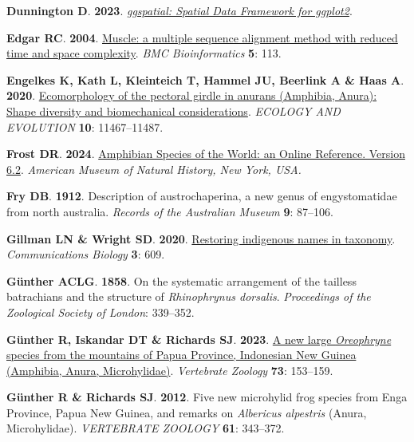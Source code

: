 \documentclass[
  letterpaper,
  DIV=11,
  numbers=noendperiod]{scrartcl}
\newlength{\cslhangindent}
\newenvironment{CSLReferences}[2] %
 {\begin{list}{}{%
  \setlength{\itemindent}{0pt}
  \setlength{\leftmargin}{0pt}
  \setlength{\parsep}{0pt}
  \ifodd #1
   \setlength{\leftmargin}{\cslhangindent}
   \setlength{\itemindent}{-1\cslhangindent}
  \fi
  \setlength{\itemsep}{#2\baselineskip}}}
 {\end{list}}
\begin{document}
\begin{CSLReferences}{0}{1}
\textbf{\textbf{Dunnington D}}. \textbf{2023}.
\emph{\href{https://CRAN.R-project.org/package=ggspatial}{{ggspatial:
Spatial Data Framework for ggplot2}}}.

\textbf{\textbf{Edgar RC}}. \textbf{2004}.
\href{https://doi.org/10.1186/1471-2105-5-113}{{Muscle: a multiple
sequence alignment method with reduced time and space complexity}}.
\emph{BMC Bioinformatics} \textbf{5}: 113.

\textbf{\textbf{Engelkes K}, \textbf{Kath L}, \textbf{Kleinteich T},
\textbf{Hammel JU}, \textbf{Beerlink A} \& \textbf{Haas A}}.
\textbf{2020}. \href{https://doi.org/10.1002/ece3.6784}{{Ecomorphology
of the pectoral girdle in anurans (Amphibia, Anura): Shape diversity and
biomechanical considerations}}. \emph{ECOLOGY AND EVOLUTION}
\textbf{10}: 11467--11487.

\textbf{\textbf{Frost DR}}. \textbf{2024}.
\href{https://doi.org/doi.org/10.5531/db.vz.0001}{{Amphibian Species of
the World: an Online Reference. Version 6.2}}. \emph{American Museum of
Natural History, New York, USA.}

\textbf{\textbf{Fry DB}}. \textbf{1912}. Description of austrochaperina,
a new genus of engystomatidae from north australia. \emph{Records of the
Australian Museum} \textbf{9}: 87--106.

\textbf{\textbf{Gillman LN} \& \textbf{Wright SD}}. \textbf{2020}.
\href{https://doi.org/10.1038/s42003-020-01344-y}{{Restoring indigenous
names in taxonomy}}. \emph{Communications Biology} \textbf{3}: 609.

\textbf{\textbf{Günther ACLG}}. \textbf{1858}. {On the systematic
arrangement of the tailless batrachians and the structure of
\emph{Rhinophrynus dorsalis}}. \emph{Proceedings of the Zoological
Society of London}: 339--352.

\textbf{\textbf{Günther R}, \textbf{Iskandar DT} \& \textbf{Richards
SJ}}. \textbf{2023}. \href{https://doi.org/10.3897/vz.73.e94207}{{A new
large \emph{Oreophryne} species from the mountains of Papua Province,
Indonesian New Guinea (Amphibia, Anura, Microhylidae)}}.
\emph{Vertebrate Zoology} \textbf{73}: 153--159.

\textbf{\textbf{Günther R} \& \textbf{Richards SJ}}. \textbf{2012}.
{Five new microhylid frog species from Enga Province, Papua New Guinea,
and remarks on \emph{Albericus alpestris} (Anura, Microhylidae)}.
\emph{VERTEBRATE ZOOLOGY} \textbf{61}: 343--372.


\end{CSLReferences}
\end{document}
